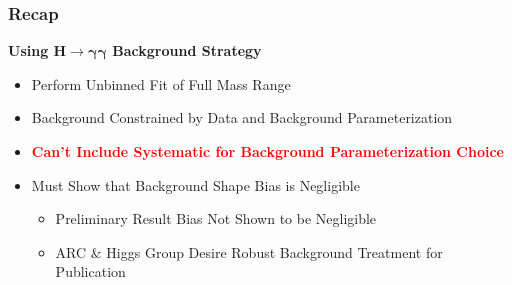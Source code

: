 \documentclass{beamer}
\newcommand{\tredbf}[1]{\textcolor{red}{\bf #1}}
\begin{document}
\begin{frame}
\frametitle{Recap}
    \textbf{Using $\bm{H\rightarrow \gamma\gamma}$ Background Strategy}
    \begin{itemize}
      \item Perform Unbinned Fit of Full Mass Range
      \item Background Constrained by Data and Background Parameterization
      \item \tredbf{Can't Include Systematic for Background Parameterization Choice}
      \item Must Show that Background Shape Bias is Negligible
      \begin{itemize}
        \item Preliminary Result Bias Not Shown to be Negligible
        \item ARC \& Higgs Group Desire Robust Background Treatment for Publication
      \end{itemize}
    \end{itemize}
\end{frame}
\end{document}
